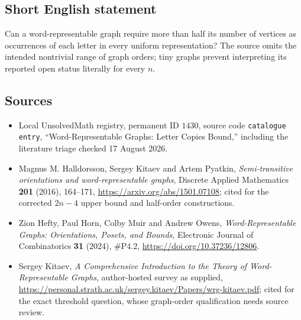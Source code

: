 \documentclass[11pt]{article}
\begin{document}
\subsection{Short English statement}
Can a word-representable graph require more than half its number of vertices as occurrences of each letter in every uniform representation? The source omits the intended nontrivial range of graph orders; tiny graphs prevent interpreting its reported open status literally for every $n$.
\subsection{Sources}
\begin{itemize}
\item Local UnsolvedMath registry, permanent ID $1430$, source code \texttt{catalogue entry}, ``Word-Representable Graphs: Letter Copies Bound,'' including the literature triage checked 17 August 2026.
\item Magnus M. Halldorsson, Sergey Kitaev and Artem Pyatkin, \emph{Semi-transitive orientations and word-representable graphs}, Discrete Applied Mathematics \textbf{201} (2016), 164--171, \url{https://arxiv.org/abs/1501.07108}; cited for the corrected $2n-4$ upper bound and half-order constructions.
\item Zion Hefty, Paul Horn, Colby Muir and Andrew Owens, \emph{Word-Representable Graphs: Orientations, Posets, and Bounds}, Electronic Journal of Combinatorics \textbf{31} (2024), \#P4.2, \url{https://doi.org/10.37236/12806}.
\item Sergey Kitaev, \emph{A Comprehensive Introduction to the Theory of Word-Representable Graphs}, author-hosted survey as supplied, \url{https://personal.strath.ac.uk/sergey.kitaev/Papers/wrg-kitaev.pdf}; cited for the exact threshold question, whose graph-order qualification needs source review.
\end{itemize}
\end{document}
